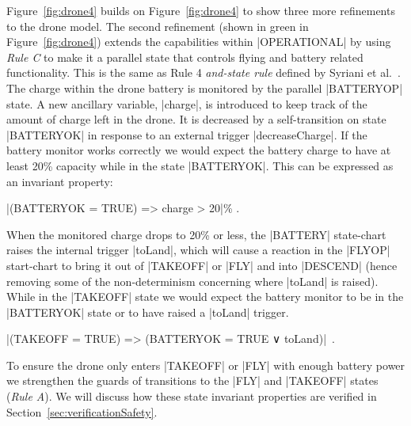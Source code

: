 Figure~\ref{fig:drone4} builds on Figure~\ref{fig:drone4} to show three more refinements to the drone model. 
The second refinement (shown in green in Figure~\ref{fig:drone4}) extends the capabilities within |OPERATIONAL| by using \emph{Rule C} to make it a parallel state that controls flying and battery related functionality. 
This is the same as Rule 4 \emph{and-state rule} defined by Syriani et al.~\cite{Syriani_2019}.
The charge within the drone battery is monitored by the parallel |BATTERYOP| state. 
A new ancillary variable, |charge|, is introduced to keep track of the amount of charge left in the drone.
It is decreased by a self-transition on state |BATTERYOK| in response to an external trigger |decreaseCharge|. 
If the battery monitor works correctly we would expect the battery charge to have at least 20\% capacity while in the state |BATTERYOK|.
This can be expressed as an invariant property:
\begin{center}
	|(BATTERYOK = TRUE) => charge > 20|\% .
\end{center}
When the monitored charge drops to 20\% or less, the |BATTERY| state-chart raises the internal trigger |toLand|, which will cause a reaction in the |FLYOP| start-chart to bring it out of |TAKEOFF| or |FLY| and into |DESCEND| (hence removing some of the non-determinism concerning where |toLand| is raised).
While in the |TAKEOFF| state we would expect the battery monitor to be in the |BATTERYOK| state or to have raised a |toLand| trigger.
\begin{center}
	|(TAKEOFF = TRUE) => (BATTERYOK = TRUE ∨ toLand)|~.
\end{center}
To ensure the drone only enters |TAKEOFF| or |FLY| with enough battery power we strengthen the guards of transitions to the |FLY| and |TAKEOFF| states (\emph{Rule A}).
We will discuss how these state invariant properties are verified in Section~\ref{sec:verificationSafety}.


